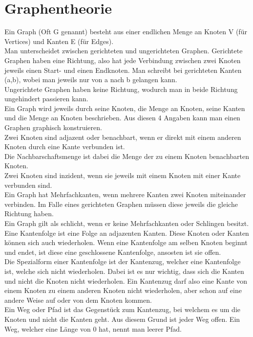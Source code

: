\documentclass{article}
\begin{document}
	\section{Graphentheorie}
	Ein Graph (Oft G genannt) besteht aus einer endlichen Menge an Knoten V (für Vertices) und Kanten E (für Edges). \\
	Man unterscheidet zwischen gerichteten und ungerichteten Graphen. Gerichtete Graphen haben eine Richtung, also hat jede Verbindung zwischen zwei Knoten jeweils einen Start- und einen Endknoten. Man schreibt bei gerichteten Kanten (a,b), wobei man jeweils nur von a nach b gelangen kann. \\
	Ungerichtete Graphen haben keine Richtung, wodurch man in beide Richtung ungehindert passieren kann. \\
	Ein Graph wird jeweils durch seine Knoten, die Menge an Knoten, seine Kanten und die Menge an Knoten beschrieben. Aus diesen 4 Angaben kann man einen Graphen graphisch konstruieren. \\
	Zwei Knoten sind adjazent oder benachbart, wenn er direkt mit einem anderen Knoten durch eine Kante verbunden ist. \\
	Die Nachbarschaftsmenge ist dabei die Menge der zu einem Knoten benachbarten Knoten. \\
	Zwei Knoten sind inzident, wenn sie jeweils mit einem Knoten mit einer Kante verbunden sind. \\
	Ein Graph hat Mehrfachkanten, wenn mehrere Kanten zwei Knoten miteinander verbinden. Im Falle eines gerichteten Graphen müssen diese jeweils die gleiche Richtung haben. \\
	Ein Graph gilt als schlicht, wenn er keine Mehrfachkanten oder Schlingen besitzt. \\
	Eine Kantenfolge ist eine Folge an adjazenten Kanten. Diese Knoten oder Kanten können sich auch wiederholen. Wenn eine Kantenfolge am selben Knoten beginnt und endet, ist diese eine geschlossene Kantenfolge, ansosten ist sie offen. \\
	Die Spezialform einer Kantenfolge ist der Kantenzug, welcher eine Kantenfolge ist, welche sich nicht wiederholen. Dabei ist es nur wichtig, dass sich die Kanten und nicht die Knoten nicht wiederholen. Ein Kantenzug darf also eine Kante von einem Knoten zu einem anderen Knoten nicht wiederholen, aber schon auf eine andere Weise auf oder von dem Knoten kommen. \\
	Ein Weg oder Pfad ist das Gegenstück zum Kantenzug, bei welchem es um die Knoten und nicht die Kanten geht. Aus diesem Grund ist jeder Weg offen. Ein Weg, welcher eine Länge von 0 hat, nennt man leerer Pfad.\\
\end{document}
